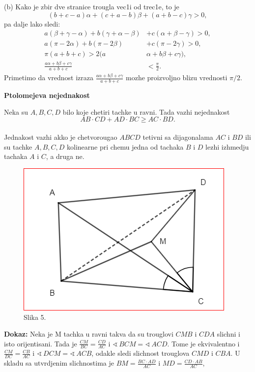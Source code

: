 \documentclass[11pt,letter]{report}
\def\ug{\mathbin{\sphericalangle\,}}
\newcommand{\D}{\displaystyle}
\begin{document}
\vspace{0.5cm}

(b) Kako je zbir dve stranice trougla vec1i od trec1e, to je $$(b+c-a)\alpha+(c+a-b)\beta+(a+b-c)\gamma>0,$$ pa dalje lako sledi:
\begin{equation*}
\begin{aligned}
a(\beta+\gamma-\alpha)+b(\gamma+\alpha-\beta)&+c(\alpha+\beta-\gamma)>0,\\
a(\pi-2\alpha)+b(\pi-2\beta)&+c(\pi-2\gamma)>0,\\
\pi(a+b+c)>2(a&\alpha+b\beta+c\gamma),\\
\D\frac{a\alpha+b\beta+c\gamma}{a+b+c}&<\frac{\pi}{2}.
\end{aligned}    
\end{equation*}
Primetimo da vrednost izraza $\D\frac{a\alpha+b\beta+c\gamma}{a+b+c}$ mozhe proizvoljno blizu vrednosti $\pi/2.$\\

\newpage
\large
\vspace*{-1in}
\begin{flushleft}
\begin{center}
    \huge
    \textbf{Ptolomejeva nejednakost}
\end{center}
\vspace*{0.4in}
Neka su $A,B,C,D$ bilo koje chetiri tachke u ravni. Tada vazhi nejednakost $$AB\cdot CD+AD\cdot BC \geq AC\cdot BD.$$\\
Jednakost vazhi akko je chetvorougao $ABCD$ tetivni sa dijagonalama $AC$ i $BD$ ili su tachke $A,B,C,D$ kolinearne pri chemu jedna od tachaka $B$ i $D$ lezhi izhmedju tachaka $A$ i $C$, a druga ne.\\
\end{flushleft}
\par
\begin{figure} %
    \centering
    \includegraphics[scale=0.53]{Slike/Slika5}
    \caption*{Slika 5.}
\end{figure}
\textbf{Dokaz:} Neka je M tachka u ravni takva da su trouglovi $CMB$ i $CDA$ slichni i isto \text orijentisani. Tada je $\D\frac{CM}{BC}=\frac{CD}{AC}$ i $\D\ug BCM=\ug ACD.$ Tome je \text ekvivalentno i $\D\frac{CM}{DC}=\frac{CB}{AC}$ i $\ug DCM=\ug ACB$, odakle sledi slichnost trouglova $CMD$ i $CBA$. U skladu sa utvrdjenim slichnostima je $\D BM=\frac{BC\cdot AD}{AC}$ i $\D MD=\frac{CD\cdot AB}{AC}$,\\
\end{document}
